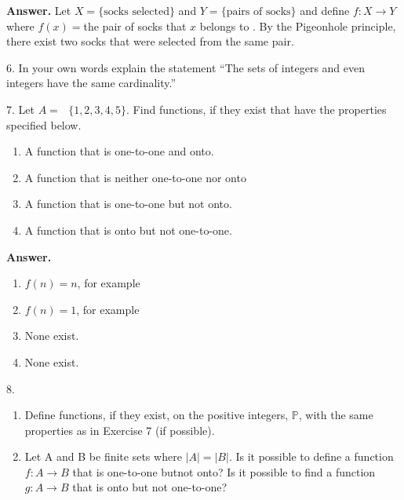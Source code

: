 \documentclass[10pt,]{book}
\theoremstyle{plain}
\theoremstyle{definition}
\theoremstyle{definition}
\theoremstyle{definition}
\begin{document}
\begin{exercisegroup}
\noindent\textbf{Answer.}\hypertarget{answer-6}{}\quad
 Let \(X=\{\textrm{socks selected}\}\) and \(Y=\{\textrm{pairs of socks}\}\) and define \(f:X \to Y\) where \(f(x) =\)the pair of socks that \(x\) belongs to . By the Pigeonhole principle, there exist two socks that were selected from the same pair.%
\item[6.]\hypertarget{exercise-14}{} In your own words explain the statement ``The sets of integers and even integers have the same cardinality.''%
\par\smallskip
\item[7.]\hypertarget{exercise-15}{}Let \(A =\text{  }\{1, 2, 3, 4, 5\}\). Find functions, if they exist that have the properties specified below.%
\par
\leavevmode%
\begin{enumerate}[label=\alph*]
\item\hypertarget{li-49}{} A function that is one-to-one and onto.%
\item\hypertarget{li-50}{} A function that is neither one-to-one nor onto%
\item\hypertarget{li-51}{} A function that is one-to-one but not onto.%
\item\hypertarget{li-52}{} A function that is onto but not one-to-one.%
\end{enumerate}
%
\par\smallskip
\par\smallskip
\noindent\textbf{Answer.}\hypertarget{answer-7}{}\quad
\leavevmode%
\begin{enumerate}[label=\alph*]
\item\hypertarget{li-53}{} \(f(n)=n\), for example%
\item\hypertarget{li-54}{} \(f(n)=1\), for example%
\item\hypertarget{li-55}{} None exist.%
\item\hypertarget{li-56}{} None exist.%
\end{enumerate}
%
\item[8.]\hypertarget{exercise-16}{}\leavevmode%
\begin{enumerate}[label=\alph*]
\item\hypertarget{li-57}{} Define functions, if they exist, on the positive integers, \(\mathbb{P}\), with the same properties as in Exercise 7 (if possible).%
\item\hypertarget{li-58}{}Let A and B be finite sets where \(|A|=|B|\). Is it possible to define a function \(f:A \rightarrow  B\) that is one-to-one butnot onto? Is it possible to find a function  \(g:A \rightarrow  B\) that is onto but not one-to-one?%
\end{enumerate}
%
\par\smallskip
\end{exercisegroup}
\end{document}
